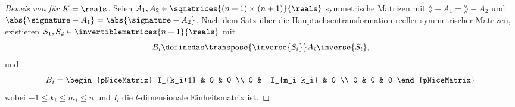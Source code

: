 \begin{proof}[Beweis von  für \( K=\reals \)]
  Seien \( A_1,A_2\in\sqmatrices{(n+1)\times (n+1)}{\reals} \) symmetrische Matrizen mit \( \rang-{A_1}=\rang-{A_2} \) und \( \abs{\signature-{A_1}}=\abs{\signature-{A_2}} \). Nach dem Satz über die Hauptachsentransformation reeller symmetrischer Matrizen, existieren \( S_1,S_2\in \invertiblematrices{n+1}{\reals} \) mit  
  \begin{equation*}
    B_i\definedas \transpose{\inverse{S_i}}A_i \inverse{S_i},
  \end{equation*}
  und
  \begin{equation*}
    B_i=\begin{pNiceMatrix} I_{k_i+1} & 0 & 0 \\ 0 & -I_{m_i-k_i} & 0 \\ 0 & 0 & 0 \end{pNiceMatrix}
  \end{equation*}
  wobei \( -1\leq k_i\leq m_i\leq n \) und \( I_l \) die \( l \)-dimensionale Einheitsmatrix ist.


\end{proof}
